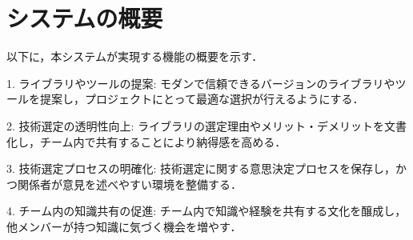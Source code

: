 \documentclass[main]{subfiles}
\begin{document}
\section{システムの概要}
以下に，本システムが実現する機能の概要を示す．

1. ライブラリやツールの提案: モダンで信頼できるバージョンのライブラリやツールを提案し，プロジェクトにとって最適な選択が行えるようにする．

2. 技術選定の透明性向上: ライブラリの選定理由やメリット・デメリットを文書化し，チーム内で共有することにより納得感を高める．

3. 技術選定プロセスの明確化: 技術選定に関する意思決定プロセスを保存し，かつ関係者が意見を述べやすい環境を整備する．

4. チーム内の知識共有の促進: チーム内で知識や経験を共有する文化を醸成し，他メンバーが持つ知識に気づく機会を増やす．
\end{document}
